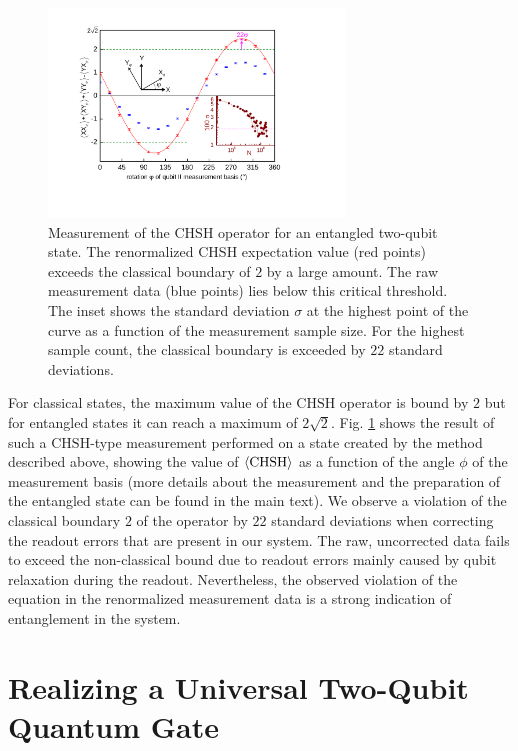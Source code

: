 \begin{figure}[ht!]
	\centering
		\includegraphics[width=0.7\textwidth]{./material/papers/iswap/submission1/Dewes_Figure3}
	\caption[Measurement of the CHSH operator of an entanged two-qubit state]{Measurement of the CHSH operator for an entangled two-qubit state. The renormalized CHSH expectation value (red points) exceeds the classical boundary of $2$ by a large amount. The raw measurement data (blue points) lies below this critical threshold. The inset shows the standard deviation $\sigma$ at the highest point of the curve as a function of the measurement sample size. For the highest sample count, the classical boundary is exceeded by $22$ standard deviations.}
	\label{fig:chsh_measurement}
\end{figure}

For classical states, the maximum value of the $\mathrm{CHSH}$ operator is bound by $2$ but for entangled states it can reach a maximum of $2\sqrt{2}$. Fig. \ref{fig:chsh_measurement} shows the result of such a $\mathrm{CHSH}$-type measurement performed on a state created by the method described above, showing the value of $\left< \mathrm{CHSH} \right>$ as a function of the angle $\phi$ of the measurement basis (more details about the measurement and the preparation of the entangled state can be found in the main text). We observe a violation of the classical boundary $2$ of the operator by $22$ standard deviations when correcting the readout errors that are present in our system. The raw, uncorrected data fails to exceed the non-classical bound due to readout errors mainly caused by qubit relaxation during the readout. Nevertheless, the observed violation of the equation in the renormalized measurement data is a strong indication of entanglement in the system.

\section{Realizing a Universal Two-Qubit Quantum Gate}

